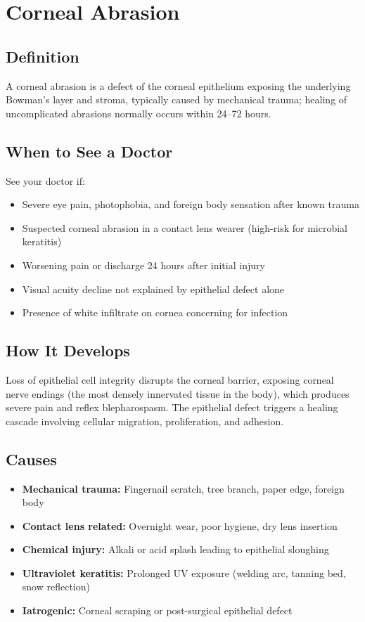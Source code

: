 \chapter{Corneal Abrasion}

\section*{Definition}
A corneal abrasion is a defect of the corneal epithelium exposing the underlying Bowman's layer and stroma, typically caused by mechanical trauma; healing of uncomplicated abrasions normally occurs within 24--72 hours.

\section*{When to See a Doctor}
See your doctor if:
\begin{itemize}
  \item Severe eye pain, photophobia, and foreign body sensation after known trauma
  \item Suspected corneal abrasion in a contact lens wearer (high-risk for microbial keratitis)
  \item Worsening pain or discharge 24 hours after initial injury
  \item Visual acuity decline not explained by epithelial defect alone
  \item Presence of white infiltrate on cornea concerning for infection
\end{itemize}

\section*{How It Develops}
Loss of epithelial cell integrity disrupts the corneal barrier, exposing corneal nerve endings (the most densely innervated tissue in the body), which produces severe pain and reflex blepharospasm. The epithelial defect triggers a healing cascade involving cellular migration, proliferation, and adhesion.

\section*{Causes}
\begin{itemize}
  \item \textbf{Mechanical trauma:} Fingernail scratch, tree branch, paper edge, foreign body
  \item \textbf{Contact lens related:} Overnight wear, poor hygiene, dry lens insertion
  \item \textbf{Chemical injury:} Alkali or acid splash leading to epithelial sloughing
  \item \textbf{Ultraviolet keratitis:} Prolonged UV exposure (welding arc, tanning bed, snow reflection)
  \item \textbf{Iatrogenic:} Corneal scraping or post-surgical epithelial defect
\end{itemize}

